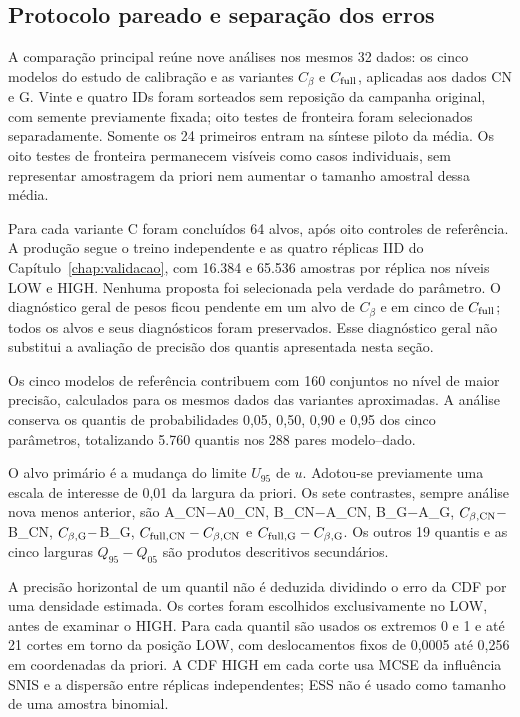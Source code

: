 \clearpage
\subsection{Protocolo pareado e separação dos erros}
\label{sec:comp-pareado-protocolo}

A comparação principal reúne nove análises nos mesmos 32 dados: os cinco
modelos do estudo de calibração e as variantes $C_\beta$ e $C_{\rm full}$,
aplicadas aos dados CN e G. Vinte e quatro IDs foram sorteados sem reposição
da campanha original, com semente previamente fixada; oito testes de
fronteira foram selecionados separadamente. Somente os 24 primeiros entram
na síntese piloto da média. Os oito testes de fronteira permanecem visíveis
como casos individuais, sem representar amostragem da priori nem aumentar
o tamanho amostral dessa média.

Para cada variante C foram concluídos 64 alvos, após oito controles de
referência. A produção segue o treino independente e as quatro réplicas IID
do Capítulo~\ref{chap:validacao}, com 16.384 e 65.536 amostras por réplica
nos níveis LOW e HIGH. Nenhuma proposta foi selecionada pela verdade do
parâmetro. O diagnóstico geral de pesos ficou pendente em um alvo de
$C_\beta$ e em cinco de $C_{\rm full}$; todos os alvos e seus diagnósticos
foram preservados. Esse diagnóstico geral não substitui a avaliação de
precisão dos quantis apresentada nesta seção.

Os cinco modelos de referência contribuem com 160 conjuntos no nível de maior precisão, calculados para os mesmos dados das variantes aproximadas. A análise conserva os
quantis de probabilidades 0,05, 0,50, 0,90 e 0,95 dos cinco parâmetros,
totalizando 5.760 quantis nos 288 pares modelo--dado.

O alvo primário é a mudança do limite $U_{95}$ de $u$. Adotou-se previamente
uma escala de interesse de 0,01 da largura da priori. Os sete contrastes,
sempre análise nova menos anterior, são A\_CN$-$A0\_CN, B\_CN$-$A\_CN,
B\_G$-$A\_G, $C_{\beta,\rm CN}-$B\_CN, $C_{\beta,\rm G}-$B\_G,
$C_{{\rm full},\rm CN}-C_{\beta,\rm CN}$ e
$C_{{\rm full},\rm G}-C_{\beta,\rm G}$. Os outros 19 quantis e as cinco
larguras $Q_{95}-Q_{05}$ são produtos descritivos secundários.

A precisão horizontal de um quantil não é deduzida dividindo o erro da
CDF por uma densidade estimada. Os cortes foram escolhidos exclusivamente
no LOW, antes de examinar o HIGH. Para cada quantil são usados os extremos
0 e 1 e até 21 cortes em torno da posição LOW, com deslocamentos fixos de
0,0005 até 0,256 em coordenadas da priori. A CDF HIGH em cada corte usa
MCSE da influência SNIS e a dispersão entre réplicas independentes;
ESS não é usado como tamanho de uma amostra binomial.

